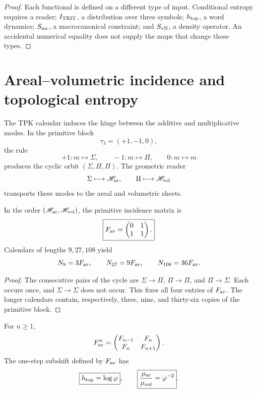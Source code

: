 \begin{proof}
Each functional is defined on a different type of input. Conditional
entropy requires a reader; \(I_{\rm TRIT}\), a distribution over three
symbols; \(h_{\rm top}\), a word dynamics; \(S_{\rm mc}\), a
macrocanonical constraint; and \(S_{\rm vN}\), a density operator. An
accidental numerical equality does not supply the maps that change those types.
\end{proof}

\section{Areal--volumetric incidence and topological entropy}

The TPK calendar induces the hinge between the additive and
multiplicative modes. In the primitive block
\[
 \tau_3=(+1,-1,0),
\]
the rule
\[
 +1:m\mapsto\Sigma,
 \qquad
 -1:m\mapsto\Pi,
 \qquad
 0:m\mapsto m
\]
produces the cyclic orbit \((\Sigma,\Pi,\Pi)\). The geometric reader
\[
 \Sigma\longmapsto\mathscr H_{\rm ar},
 \qquad
 \Pi\longmapsto\mathscr H_{\rm vol}
\]
transports these modes to the areal and volumetric sheets.

\begin{theorem}
\label{thm:incidencia-hojas-anexo}
In the order \((\mathscr H_{\rm ar},\mathscr H_{\rm vol})\), the
primitive incidence matrix is
\begin{equation}
 \boxed{
 F_{\rm av}=
 \begin{pmatrix}0&1\\1&1\end{pmatrix}.}
 \label{eq:fav-anexo-informacion}
\end{equation}
Calendars of lengths \(9,27,108\) yield
\[
 N_9=3F_{\rm av},
 \qquad N_{27}=9F_{\rm av},
 \qquad N_{108}=36F_{\rm av}.
\]
\end{theorem}

\begin{proof}
The consecutive pairs of the cycle are
\(\Sigma\to\Pi\), \(\Pi\to\Pi\), and \(\Pi\to\Sigma\). Each occurs
once, and \(\Sigma\to\Sigma\) does not occur. This fixes all four entries of
\(F_{\rm av}\). The longer calendars contain, respectively, three,
nine, and thirty-six copies of the primitive block.
\end{proof}

\begin{theorem}
\label{thm:fibonacci-parry-anexo}
For \(n\geq1\),
\begin{equation}
 F_{\rm av}^{n}
 =\begin{pmatrix}F_{n-1}&F_n\\F_n&F_{n+1}\end{pmatrix}.
 \label{eq:potencias-fav-anexo}
\end{equation}
The one-step subshift defined by \(F_{\rm av}\) has
\begin{equation}
 \boxed{h_{\rm top}=\log\varphi},
 \qquad
 \boxed{\frac{\mu_{\rm ar}}{\mu_{\rm vol}}=\varphi^{-2}}.
 \label{eq:entropia-parry-hojas-anexo}
\end{equation}
\end{theorem}

